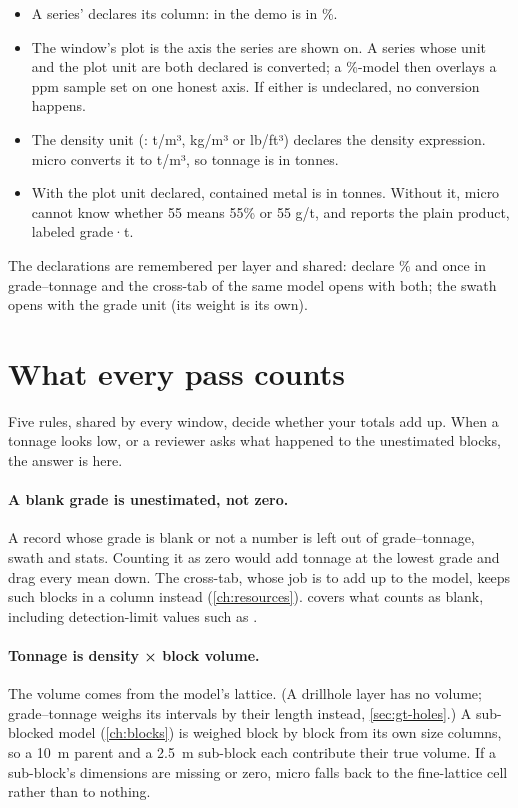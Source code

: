 \begin{itemize}
\item A series'  declares its column:  in the demo is in \%.
\item The window's plot  is the axis the series are shown on. A series whose unit and the plot unit are both declared is converted; a \%-model then overlays a ppm sample set on one honest axis. If either is undeclared, no conversion happens.
\item The density unit (: t/m³, kg/m³ or lb/ft³) declares the density expression. micro converts it to t/m³, so tonnage is in tonnes.
\item With the plot unit declared, contained metal is in tonnes. Without it, micro cannot know whether 55 means 55\% or 55 g/t, and reports the plain product, labeled grade·t.
\end{itemize}

The declarations are remembered per layer and shared: declare \% and  once in grade–tonnage and the cross-tab of the same model opens with both; the swath opens with the grade unit (its weight is its own).

\section{What every pass counts}\label{sec:analysis-rules}
Five rules, shared by every window, decide whether your totals add up. When a tonnage looks low, or a reviewer asks what happened to the unestimated blocks, the answer is here.

\paragraph{A blank grade is unestimated, not zero.} A record whose grade is blank or not a number is left out of grade–tonnage, swath and stats. Counting it as zero would add tonnage at the lowest grade and drag every mean down. The cross-tab, whose job is to add up to the model, keeps such blocks in a  column instead (\cref{ch:resources}).  covers what counts as blank, including detection-limit values such as .

\paragraph{Tonnage is density × block volume.} The volume comes from the model's lattice. (A drillhole layer has no volume; grade–tonnage weighs its intervals by their length instead, \cref{sec:gt-holes}.) A sub-blocked model (\cref{ch:blocks}) is weighed block by block from its own size columns, so a 10~m parent and a 2.5~m sub-block each contribute their true volume. If a sub-block's dimensions are missing or zero, micro falls back to the fine-lattice cell rather than to nothing.

